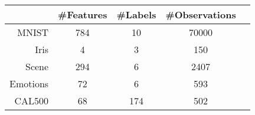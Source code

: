 \begin{tabular}{r|cccc}
& \#Features & \#Labels & \#Observations \\
\hline
MNIST & 784 & 10 & 70000 \\
Iris & 4 & 3 & 150 \\
Scene & 294 & 6 & 2407 \\
Emotions & 72 & 6 & 593 \\
CAL500 & 68 & 174 & 502 \\
\end{tabular}
